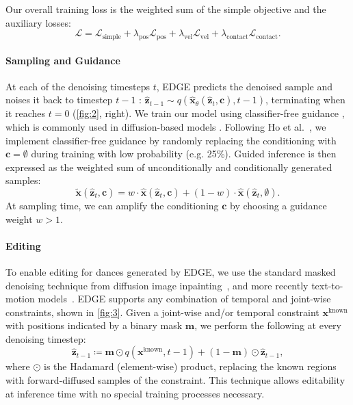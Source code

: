 \documentclass[10pt,twocolumn,letterpaper]{article}
\begin{document}
Our overall training loss is the weighted sum of the simple objective and the auxiliary losses:
\begin{equation} \label{eq:6}
{
\mathcal{L} = \mathcal{L}_\text{simple} + \lambda_\text{pos}\mathcal{L}_\text{pos} + \lambda_\text{vel}\mathcal{L}_\text{vel} + \lambda_\text{contact}\mathcal{L}_\text{contact}.
}
\end{equation}

\paragraph{Sampling and Guidance}
At each of the denoising timesteps $t$, EDGE predicts the denoised sample and noises it back to timestep $t-1$ : $\bm{\hat{z}}_{t-1} \sim q(\bm{\hat{x}}_\theta(\bm{\hat{z}}_t, \bm{c}), t-1)$, terminating when it reaches $t=0$ (\cref{fig:2}, right).
We train our model using classifier-free guidance \cite{ho2022classifier}, which is commonly used in diffusion-based models \cite{saharia2022photorealistic, rombach2022high, tevet2022human, kim2022flame, zhang2022motiondiffuse}.
Following Ho et al.~\cite{ho2022classifier}, we implement classifier-free guidance by randomly replacing the conditioning with $\bm{c} = \emptyset$ during training with low probability (e.g. 25\%).
Guided inference is then expressed as the weighted sum of unconditionally and conditionally generated samples:
\begin{equation} \label{eq:7}
{
\bm{\tilde{x}}(\bm{\hat{z}}_t, \bm{c}) = w \cdot \bm{\hat{x}}(\bm{\hat{z}}_t, \bm{c}) + (1 - w) \cdot \bm{\hat{x}}(\bm{\hat{z}}_t, \emptyset).
}
\end{equation}
At sampling time, we can amplify the conditioning $\bm{c}$ by choosing a guidance weight $w > 1$.

\paragraph{Editing}
To enable editing for dances generated by EDGE, we use the standard masked denoising technique from diffusion image inpainting~\cite{lugmayr2022repaint}, and more recently text-to-motion models~\cite{kim2022flame, tevet2022human}. EDGE supports any combination of temporal and joint-wise constraints, shown in \cref{fig:3}. Given a joint-wise and/or temporal constraint $\bm{x}^{\text{known}}$ with positions indicated by a binary mask $\bm{m}$, we perform the following at every denoising timestep:
\begin{equation} \label{eq:8}
    \bm{\hat{z}}_{t-1} \coloneqq \bm{m} \odot q(\bm{x}^{\text{known}}, t-1) + (1 - \bm{m}) \odot \bm{\hat{z}}_{t-1},
\end{equation}
where $\odot$ is the Hadamard (element-wise) product, replacing the known regions with forward-diffused samples of the constraint. This technique allows editability at inference time with no special training processes necessary.
\end{document}
